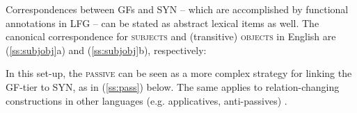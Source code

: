 \documentclass[output=paper,hidelinks]{langscibook}
\begin{document}
Correspondences between GFs and SYN -- which are accomplished by functional annotations in LFG -- can be stated as abstract lexical items as well. The canonical correspondence for \textsc{subjects} and (transitive) \textsc{objects} in English are (\ref{ss:subjobj}a) and (\ref{ss:subjobj}b), respectively:

\begin{exe}
\label{ss:subjobj}
\end{exe}

In this set-up, the \textsc{passive} can be seen as a more complex strategy for linking the GF-tier to SYN, as in (\ref{ss:pass}) below. The same applies to relation-changing constructions in other languages (e.g. applicatives, anti-passives) \citep{culicover2009natural}.

\begin{exe}
\label{ss:pass}
\end{exe}
\end{document}
